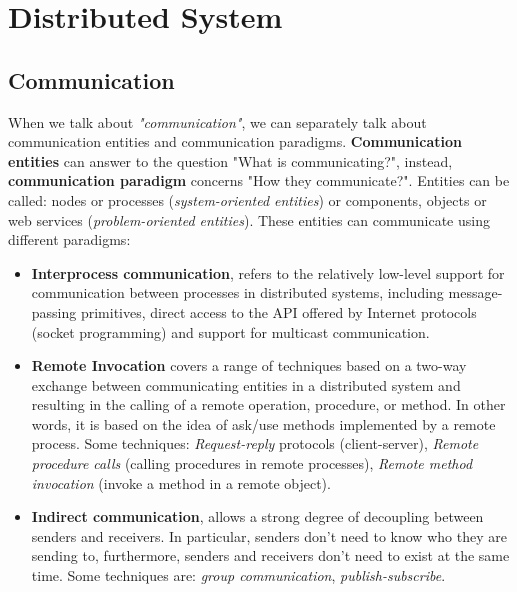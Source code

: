 \section{Distributed System}
\subsection{Communication}
When we talk about \textit{"communication"}, we can separately talk about communication entities and communication paradigms. \textbf{Communication entities} can answer to the question "What is communicating?", instead, \textbf{communication paradigm} concerns "How they communicate?". Entities can be called: nodes or processes (\textit{system-oriented entities}) or components, objects or web services (\textit{problem-oriented entities}).
These entities can communicate using different paradigms: 
\begin{itemize}
    \item \textbf{Interprocess communication}, refers to the relatively low-level support for communication between processes in distributed systems, including message-passing primitives, direct access to the API offered by Internet protocols (socket programming) and support for multicast communication.
    \item \textbf{Remote Invocation} covers a range of techniques based on a two-way exchange between communicating entities in a distributed system and resulting in the calling of a remote operation, procedure, or method. In other words, it is based on the idea of ask/use methods implemented by a remote process. Some techniques: \textit{Request-reply} protocols (client-server), \textit{Remote procedure calls} (calling procedures in remote processes), \textit{Remote method invocation} (invoke a method in a remote object).
    \item \textbf{Indirect communication}, allows a strong degree of decoupling between senders and receivers. In particular, senders don't need to know who they are sending to, furthermore, senders and receivers don't need to exist at the same time. Some techniques are: \textit{group communication}, \textit{publish-subscribe}.
\end{itemize}

